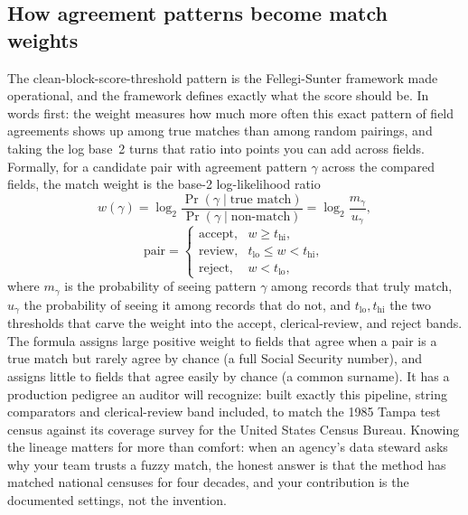 \subsection{How agreement patterns become match weights}\label{sec:ch06-fspedigree}
The clean-block-score-threshold pattern is the Fellegi-Sunter framework made operational, and the framework defines exactly what the score should be. In words first: the weight measures how much more often this exact pattern of field agreements shows up among true matches than among random pairings, and taking the log base~2 turns that ratio into points you can add across fields. Formally, for a candidate pair with agreement pattern $\gamma$ across the compared fields, the match weight is the base-2 log-likelihood ratio
\[
  w(\gamma)=\log_2\frac{\Pr(\gamma\mid\text{true match})}{\Pr(\gamma\mid\text{non-match})}
           =\log_2\frac{m_\gamma}{u_\gamma},
\]
\[
  \text{pair}=\begin{cases}
    \text{accept}, & w \ge t_{\text{hi}},\\
    \text{review}, & t_{\text{lo}} \le w < t_{\text{hi}},\\
    \text{reject}, & w < t_{\text{lo}},
  \end{cases}
\]
where $m_\gamma$ is the probability of seeing pattern $\gamma$ among records that truly match, $u_\gamma$ the probability of seeing it among records that do not, and $t_{\text{lo}},t_{\text{hi}}$ the two thresholds that carve the weight into the accept, clerical-review, and reject bands. The formula assigns large positive weight to fields that agree when a pair is a true match but rarely agree by chance (a full Social Security number), and assigns little to fields that agree easily by chance (a common surname). It has a production pedigree an auditor will recognize: \textcite{jaro1989tampa} built exactly this pipeline, string comparators and clerical-review band included, to match the 1985 Tampa test census against its coverage survey for the United States Census Bureau. Knowing the lineage matters for more than comfort: when an agency's data steward asks why your team trusts a fuzzy match, the honest answer is that the method has matched national censuses for four decades, and your contribution is the documented settings, not the invention.


